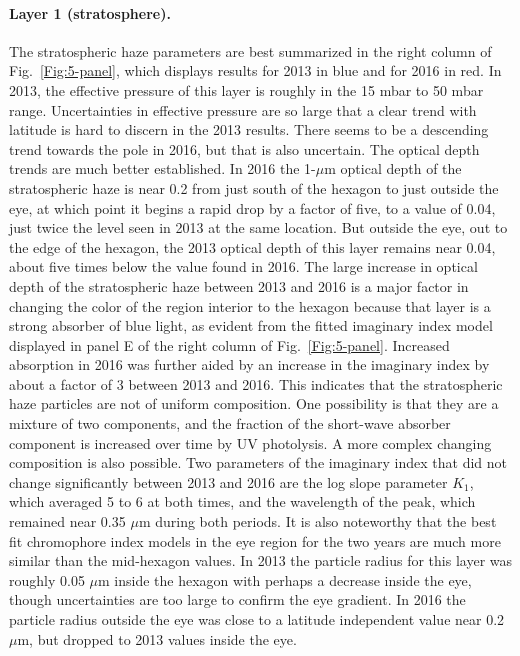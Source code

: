 \documentclass[article,11pt]{emulateapj}
\def\mum{$\mu$m }
\def\mumx{$\mu$m}
\begin{document}
\paragraph{Layer 1 (stratosphere).} The stratospheric haze parameters are
best summarized in the right column of Fig.\ \ref{Fig:5-panel},
which displays results for 2013 in blue and for 2016 in red. In 2013,
the effective pressure of this layer is roughly in the 15 mbar to 50
mbar range.  Uncertainties in effective pressure are so large that a
clear trend with latitude is hard to discern in the 2013 results.
There seems to be a descending trend towards the pole in 2016, but
that is also uncertain.  The optical depth trends are much better
established.  In 2016 the 1-\mum optical depth of the stratospheric
haze is near 0.2 from just south of the hexagon to just outside the eye, at
which point it begins a rapid drop by a factor of five, to a value of
0.04, just twice the level seen in 2013 at the same location. But
outside the eye, out to the edge of the hexagon, the 2013 optical depth
of this layer remains near 0.04, about five times below the value found in 2016. The
large increase in optical depth of the stratospheric haze between 2013
and 2016 is a major factor in changing the color of the region
interior to the hexagon because that layer is a strong absorber of blue
light, as evident from the fitted imaginary index model displayed in
panel E of the right column of Fig.\ \ref{Fig:5-panel}. Increased
absorption in 2016 was further aided by an increase in the imaginary
index by about a factor of 3 between 2013 and 2016.  This indicates
that the stratospheric haze particles are not of uniform composition.
One possibility is that they are a mixture of two components, and the
fraction of the short-wave absorber component is increased over time
by UV photolysis.  A more complex changing composition is also
possible. Two parameters of the imaginary index that did not change
significantly between 2013 and 2016 are the log slope parameter $K_1$,
which averaged 5 to 6 at both times, and the wavelength of the peak, which
remained near 0.35 \mum during both
periods. It is also noteworthy that the best fit chromophore index
models in the eye region for the two years are much more similar
than the mid-hexagon values.
In 2013 the  particle radius for this layer was roughly 0.05 \mum
inside the hexagon with perhaps a decrease inside the eye,
though uncertainties are too large to confirm the eye gradient.
In 2016 the particle radius outside the eye was close to
a latitude independent value near 0.2 \mumx, but dropped to
2013 values inside the eye.
\end{document}
